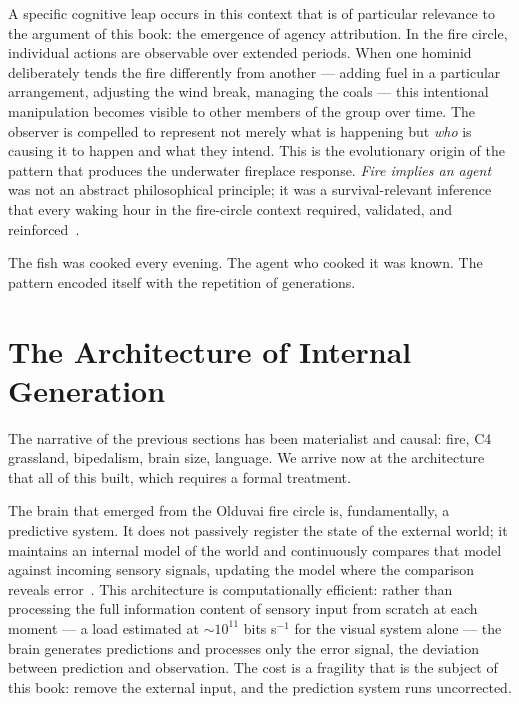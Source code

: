 A specific cognitive leap occurs in this context that is of particular relevance to the argument of this book: the emergence of agency attribution. In the fire circle, individual actions are observable over extended periods. When one hominid deliberately tends the fire differently from another --- adding fuel in a particular arrangement, adjusting the wind break, managing the coals --- this intentional manipulation becomes visible to other members of the group over time. The observer is compelled to represent not merely what is happening but \textit{who} is causing it to happen and what they intend. This is the evolutionary origin of the pattern that produces the underwater fireplace response. \textit{Fire implies an agent} was not an abstract philosophical principle; it was a survival-relevant inference that every waking hour in the fire-circle context required, validated, and reinforced~\cite{author_fire_circle}.

The fish was cooked every evening. The agent who cooked it was known. The pattern encoded itself with the repetition of generations.

\bigskip

\section{The Architecture of Internal Generation}

The narrative of the previous sections has been materialist and causal: fire, C4 grassland, bipedalism, brain size, language. We arrive now at the architecture that all of this built, which requires a formal treatment.

The brain that emerged from the Olduvai fire circle is, fundamentally, a predictive system. It does not passively register the state of the external world; it maintains an internal model of the world and continuously compares that model against incoming sensory signals, updating the model where the comparison reveals error~\cite{rao1999, friston2010, clark2013}. This architecture is computationally efficient: rather than processing the full information content of sensory input from scratch at each moment --- a load estimated at $\sim 10^{11}$ bits s$^{-1}$ for the visual system alone --- the brain generates predictions and processes only the error signal, the deviation between prediction and observation. The cost is a fragility that is the subject of this book: remove the external input, and the prediction system runs uncorrected.

